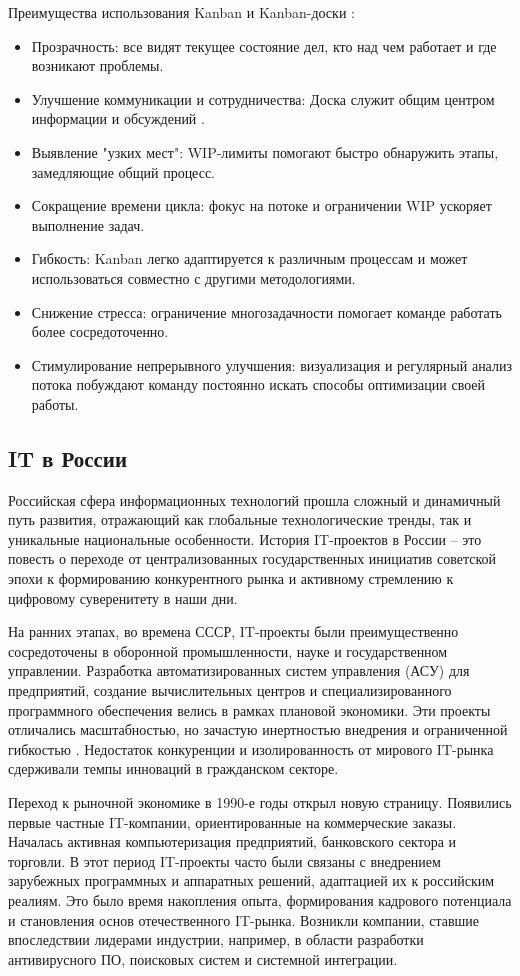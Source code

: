 Преимущества использования Kanban и Kanban-доски \cite{kanban5}:
\begin{itemize}
	\item Прозрачность: все видят текущее состояние дел, кто над чем работает и где возникают проблемы.
	\item Улучшение коммуникации и сотрудничества: Доска служит общим центром информации и обсуждений \cite{management5}.
	\item Выявление "узких мест": WIP-лимиты помогают быстро обнаружить этапы, замедляющие общий процесс.
	\item Сокращение времени цикла: фокус на потоке и ограничении WIP ускоряет выполнение задач.
	\item Гибкость: Kanban легко адаптируется к различным процессам и может использоваться совместно с другими методологиями.
	\item Снижение стресса: ограничение многозадачности помогает команде работать более сосредоточенно.
	\item Стимулирование непрерывного улучшения: визуализация и регулярный анализ потока побуждают команду постоянно искать способы оптимизации своей работы.
\end{itemize}

\subsection{IT в России}

Российская сфера информационных технологий прошла сложный и динамичный путь развития, отражающий как глобальные технологические тренды, так и уникальные национальные особенности. История IT-проектов в России – это повесть о переходе от централизованных государственных инициатив советской эпохи к формированию конкурентного рынка и активному стремлению к цифровому суверенитету в наши дни.

На ранних этапах, во времена СССР, IT-проекты были преимущественно сосредоточены в оборонной промышленности, науке и государственном управлении. Разработка автоматизированных систем управления (АСУ) для предприятий, создание вычислительных центров и специализированного программного обеспечения велись в рамках плановой экономики. Эти проекты отличались масштабностью, но зачастую инертностью внедрения и ограниченной гибкостью \cite{management3}. Недостаток конкуренции и изолированность от мирового IT-рынка сдерживали темпы инноваций в гражданском секторе.

Переход к рыночной экономике в 1990-е годы открыл новую страницу. Появились первые частные IT-компании, ориентированные на коммерческие заказы. Началась активная компьютеризация предприятий, банковского сектора и торговли. В этот период IT-проекты часто были связаны с внедрением зарубежных программных и аппаратных решений, адаптацией их к российским реалиям. Это было время накопления опыта, формирования кадрового потенциала и становления основ отечественного IT-рынка. Возникли компании, ставшие впоследствии лидерами индустрии, например, в области разработки антивирусного ПО, поисковых систем и системной интеграции.

